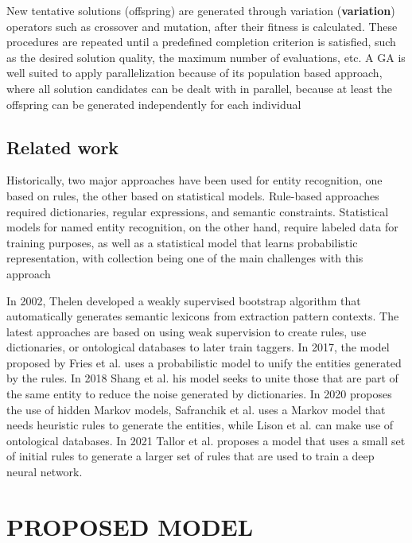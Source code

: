 \documentclass{IEEEtran}
\begin{document}
New tentative solutions (offspring) are generated through variation (\textbf{variation}) operators such as crossover and mutation, after their fitness is calculated. These procedures are repeated until a predefined completion criterion is satisfied, such as the desired solution quality, the maximum number of evaluations, etc. A GA is well suited to apply parallelization because of its population based approach, where all solution candidates can be dealt with in parallel\cite{Linder2020-Parallel}, because at least the offspring can be generated independently for each individual

\subsection{Related work}

Historically, two major approaches have been used for entity recognition, one based on rules, the other based on statistical models\cite{martin-2020-speech,Safranchik2020}. Rule-based approaches required dictionaries, regular expressions, and semantic constraints\cite{Lison2020}. Statistical models for named entity recognition, on the other hand, require labeled data for training purposes, as well as a statistical model that learns probabilistic representation, with collection being one of the main challenges with this approach\cite{Fries2017,Lison2020,tallor}

In 2002, Thelen developed a weakly supervised bootstrap algorithm that automatically generates semantic lexicons from extraction pattern contexts\cite{seman_lex}. The latest approaches are based on using weak supervision to create rules, use dictionaries, or ontological databases to later train taggers. In 2017, the model proposed by Fries et al. \cite{Fries2017} uses a probabilistic model to unify the entities generated by the rules. In 2018 Shang et al. \cite{Shang2018} his model seeks to unite those that are part of the same entity to reduce the noise generated by dictionaries.
In 2020 \cite{Safranchik2020,Lison2020} proposes the use of hidden Markov models, Safranchik et al. \cite{Safranchik2020} uses a Markov model that needs heuristic rules to generate the entities, while Lison et al. \cite{Lison2020} can make use of ontological databases. In 2021 Tallor et al. \cite{tallor} proposes a model that uses a small set of initial rules to generate a larger set of rules that are used to train a deep neural network.


\section{PROPOSED MODEL}
\end{document}

